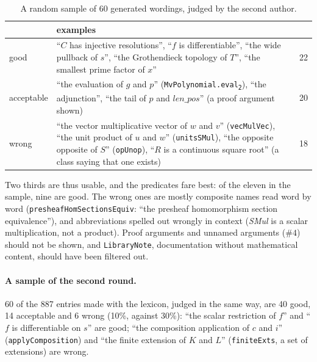 \documentclass{easychair}
\newcommand{\ttt}[1]{\texttt{#1}}
\begin{document}
\begin{table}[t]
\centering\small
\begin{tabular}{lp{}r}
\toprule
& examples & \\
\midrule
good & ``$C$ has injective resolutions'', ``$f$ is differentiable'', ``the wide pullback of $s$'',
       ``the Grothendieck topology of $T$'', ``the smallest prime factor of $x$'' & 22 \\
acceptable & ``the evaluation of $g$ and $p$'' (\ttt{MvPolynomial.eval\textsubscript{2}}), ``the
       adjunction'', ``the tail of $p$ and $\mathit{len\_pos}$'' (a proof argument shown) & 20 \\
wrong & ``the vector multiplicative vector of $w$ and $v$'' (\ttt{vecMulVec}), ``the unit
       product of $u$ and $w$'' (\ttt{unitsSMul}), ``the opposite opposite of $S$''
       (\ttt{opUnop}), ``$R$ is a continuous square root'' (a class saying that one exists) & 18 \\
\bottomrule
\end{tabular}
\caption{A random sample of 60 generated wordings, judged by the second author.}
\label{tab:sample}
\end{table}

Two thirds are thus usable, and the predicates fare best: of the eleven in the sample, nine are
good. The wrong ones are mostly composite names read word by word
(\ttt{presheaf\-Hom\-Sections\-Equiv}: ``the presheaf homomorphism section equivalence''), and
abbreviations spelled out wrongly in context (\emph{SMul} is a scalar multiplication, not a
product). Proof arguments and unnamed arguments ($\#4$) should not be shown, and
\ttt{LibraryNote}, documentation without mathematical content, should have been filtered out.

\paragraph{A sample of the second round.} 60 of the 887 entries made with the lexicon, judged in
the same way, are 40 good, 14 acceptable and 6 wrong (10\%, against 30\%): ``the scalar
restriction of $f$'' and ``$f$ is differentiable on $s$'' are good; ``the composition application
of $c$ and $i$'' (\ttt{applyComposition}) and ``the finite extension of $K$ and $L$''
(\ttt{finiteExts}, a set of extensions) are wrong.
\end{document}
